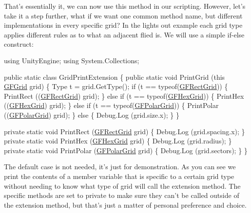 That's essentially it, we can now use this method in our scripting. However, let's take it a step further, what if we want one common method name, but different implementations in every specific grid? In the lights out example each grid type applies different rules as to what an adjacent flied is. We will use a simple if-\/else construct\+: 
\begin{DoxyCode}
\textcolor{keyword}{using} UnityEngine;
\textcolor{keyword}{using} System.Collections;

\textcolor{keyword}{public} \textcolor{keyword}{static} \textcolor{keyword}{class }GridPrintExtension \{
    \textcolor{keyword}{public} \textcolor{keyword}{static} \textcolor{keywordtype}{void} PrintGrid (\textcolor{keyword}{this} \hyperlink{class_g_f_grid}{GFGrid} grid) \{
        Type t = grid.GetType();
        \textcolor{keywordflow}{if} (t == typeof(\hyperlink{class_g_f_rect_grid}{GFRectGrid})) \{
            PrintRect ((\hyperlink{class_g_f_rect_grid}{GFRectGrid}) grid);
        \} \textcolor{keywordflow}{else} \textcolor{keywordflow}{if} (t == typeof(\hyperlink{class_g_f_hex_grid}{GFHexGrid})) \{
            PrintHex ((\hyperlink{class_g_f_hex_grid}{GFHexGrid}) grid);
        \} \textcolor{keywordflow}{else} \textcolor{keywordflow}{if} (t == typeof(\hyperlink{class_g_f_polar_grid}{GFPolarGrid})) \{
            PrintPolar ((\hyperlink{class_g_f_polar_grid}{GFPolarGrid}) grid);
        \} \textcolor{keywordflow}{else} \{
            Debug.Log (grid.size.x);
        \}
    \}
    
    \textcolor{keyword}{private} \textcolor{keyword}{static} \textcolor{keywordtype}{void} PrintRect (\hyperlink{class_g_f_rect_grid}{GFRectGrid} grid) \{
        Debug.Log (grid.spacing.x);
    \}
    \textcolor{keyword}{private} \textcolor{keyword}{static} \textcolor{keywordtype}{void} PrintHex (\hyperlink{class_g_f_hex_grid}{GFHexGrid} grid) \{
        Debug.Log (grid.radius);
    \}
    \textcolor{keyword}{private} \textcolor{keyword}{static} \textcolor{keywordtype}{void} PrintPolar (\hyperlink{class_g_f_polar_grid}{GFPolarGrid} grid) \{
        Debug.Log (grid.sectors);
    \}
\}
\end{DoxyCode}
 The default case is not needed, it's just for demonstration. As you can see we print the contents of a member variable that is specific to a certain grid type without needing to know what type of grid will call the extension method. The specific methods are set to private to make sure they can't be called outside of the extension method, but that's just a matter of personal preference and choice. 
